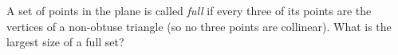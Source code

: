A set of points in the plane is called \emph{full} if every three of its points are the vertices of a non-obtuse triangle (so no three points are collinear). What is the largest size of a full set?
